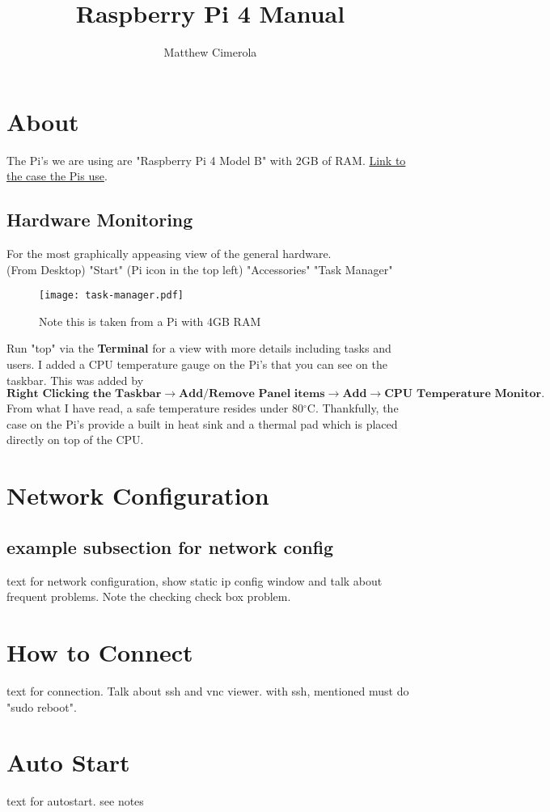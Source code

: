 \documentclass[12pt]{extarticle}
\author{Matthew Cimerola}
\title{Raspberry Pi 4 Manual}
\begin{document}
\maketitle

\tableofcontents
\newpage
\section{About}
The Pi's we are using are "Raspberry Pi 4 Model B" with 2GB of RAM. \href{https://www.amazon.com/Flirc-Raspberry-Pi-Case-Silver/dp/B07WG4DW52/ref=sr_1_5?keywords=Raspberry+Pi+4+Case&qid=1658852531&sr=8-5}{Link to the case the Pis use}. 
\subsection{Hardware Monitoring}
For the most graphically appeasing view of the general hardware.\\ 
(From Desktop) "Start" (Pi icon in the top left) \rightarrow "Accessories" \rightarrow "Task Manager" 

\begin{figure}[ht]
    \centering
    \texttt{[image: task-manager.pdf]}
    \caption{Note this is taken from a Pi with 4GB RAM}
\end{figure}
Run "top" via the \textbf{Terminal} for a view with more details including tasks and users. I added a CPU temperature gauge on the Pi's that you can see on the taskbar. This was added by $ \textbf{Right Clicking the Taskbar} \rightarrow \textbf{Add/Remove Panel items} \rightarrow \textbf{Add} \rightarrow \textbf{CPU Temperature Monitor}. $ From what I have read, a safe temperature resides under 80$^{\circ}$C. Thankfully, the case on the Pi's provide a built in heat sink and a thermal pad which is placed directly on top of the CPU.


\newpage
\section{Network Configuration}
\subsection{example subsection for network config}
text for network configuration, show static ip config window and talk about frequent problems. Note the checking check box problem.

\newpage
\section{How to Connect}
text for connection. Talk about ssh and vnc viewer. with ssh, mentioned must do "sudo reboot".


\newpage
\section{Auto Start}
text for autostart. see notes
\end{document}

